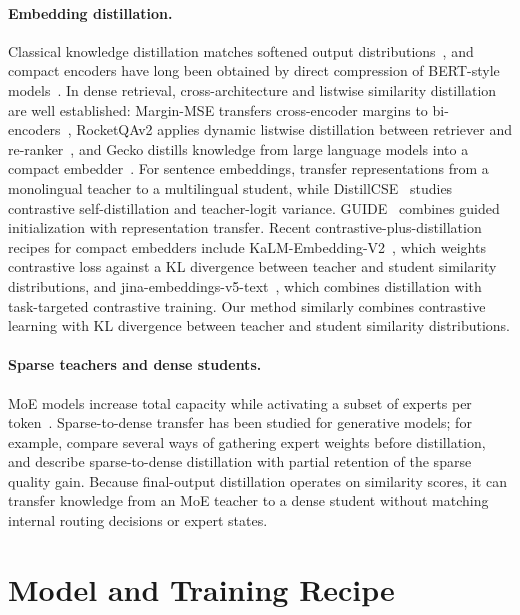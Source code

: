 \documentclass{article}
\begin{document}
\paragraph{Embedding distillation.}
Classical knowledge distillation matches softened output distributions~\citep{hinton2015distilling}, and compact encoders have long been obtained by direct compression of BERT-style models~\citep{sun2019patient,sanh2019distilbert,jiao2020tinybert,sun2020mobilebert}.
In dense retrieval, cross-architecture and listwise similarity distillation are well established: Margin-MSE transfers cross-encoder margins to bi-encoders~\citep{hofstaetter2020improving}, RocketQAv2 applies dynamic listwise distillation between retriever and re-ranker~\citep{ren2021rocketqav2}, and Gecko distills knowledge from large language models into a compact embedder~\citep{lee2024gecko}.
For sentence embeddings, \citet{reimers2020multilingual} transfer representations from a monolingual teacher to a multilingual student, while DistillCSE~\citep{xu2023distillcse} studies contrastive self-distillation and teacher-logit variance.
GUIDE~\citep{trinh2025guide} combines guided initialization with representation transfer.
Recent contrastive-plus-distillation recipes for compact embedders include KaLM-Embedding-V2~\citep{zhao2026kalm}, which weights contrastive loss against a KL divergence between teacher and student similarity distributions, and jina-embeddings-v5-text~\citep{akram2026jina}, which combines distillation with task-targeted contrastive training.
Our method similarly combines contrastive learning with KL divergence between teacher and student similarity distributions.

\paragraph{Sparse teachers and dense students.}
MoE models increase total capacity while activating a subset of experts per token~\citep{shazeer2017outrageously,fedus2022switch,jiang2024mixtral}.
Sparse-to-dense transfer has been studied for generative models; for example, \citet{xue2022one} compare several ways of gathering expert weights before distillation, and \citet{fedus2022switch} describe sparse-to-dense distillation with partial retention of the sparse quality gain.
Because final-output distillation operates on similarity scores, it can transfer knowledge from an MoE teacher to a dense student without matching internal routing decisions or expert states.

\section{Model and Training Recipe}
\label{sec:method}
\end{document}
